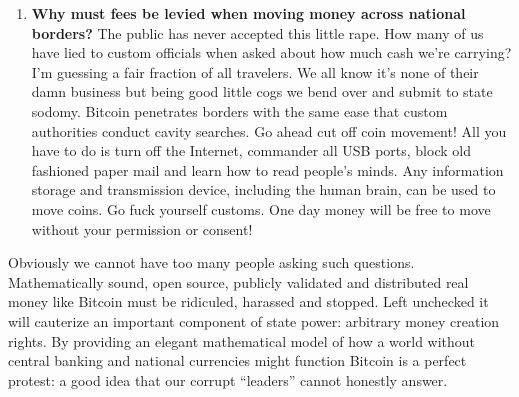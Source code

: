 \begin{enumerate}
{  funds?} A Bitcoin feature that is particularly disturbing to
  authorities is that it's not difficult to prevent even powerful
  entities from seizing coins. A coin cannot be moved or spent unless
  you get its private key. If you do not know the private key a Bitcoin
  will just sit in the Blockchain taunting goons that covet it. In a
  Bitcoin economy it will be difficult to garnish wages, block money
  transfers and seize assets. How will the state survive?
\item
  \textbf{Why must fees be levied when moving money across national
  borders?} The public has never accepted this little rape. How many of
  us have lied to custom officials when asked about how much cash we're
  carrying?  I'm guessing a fair fraction of all travelers. We all know
  it's none of their damn business but being good little cogs we bend
  over and submit to state sodomy. Bitcoin penetrates borders with the
  same ease that custom authorities conduct cavity searches. Go ahead
  cut off coin movement! All you have to do is turn off the Internet,
  commander all USB ports, block old fashioned paper mail and learn how
  to read people's minds. Any information storage and transmission
  device, including the human brain, can be used to move coins. Go fuck
  yourself customs. One day money will be free to move without your
  permission or consent!
\end{enumerate}

Obviously we cannot have too many people asking such questions.
Mathematically sound, open source, publicly validated and distributed
real money like Bitcoin must be ridiculed, harassed and stopped. Left
unchecked it will cauterize an important component of state power:
arbitrary money creation rights. By providing an elegant mathematical
model of how a world without central banking and national currencies
might function Bitcoin is a perfect protest: a good idea that our
corrupt ``leaders'' cannot honestly answer.



%
